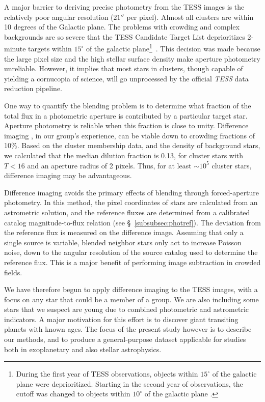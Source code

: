 \documentclass[12pt,twocolumn,tighten]{aastex62}
\begin{document}
A major barrier to deriving precise photometry from the TESS images is
the relatively poor angular resolution ($21''$ per pixel).  Almost all
clusters are within 10 degrees of the Galactic plane. The problems
with crowding and complex backgrounds are so severe that the TESS
Candidate Target List deprioritizes 2-minute targets within $15^\circ$
of the galactic plane\footnote{During the first year of TESS
observations, objects within $15^\circ$ of the galactic plane were
deprioritized. Starting in the second year of observations,
the cutoff was changed to
objects within $10^\circ$ of the galactic plane
\citep{stassun_TIC8_2019}.}~\citep{stassun_TIC_2018,stassun_TIC8_2019}.
This decision was made because the large pixel size and the high
stellar surface density make aperture photometry unreliable.  However,
it implies that most stars in clusters, though capable of yielding a
cornucopia of science, will go unprocessed by the official {\it TESS}
data reduction pipeline.

One way to quantify the blending problem is to determine what fraction
of the total flux in a photometric aperture is contributed by a
particular target star. Aperture photometry is reliable when this
fraction is close to unity.  Difference imaging
\citep{Alard_Lupton_1998,miller_optimal_2008}, in our group's
experience, can be viable down to crowding fractions of 10\%.  Based
on the \citet{Kharchenko_et_al_2013} cluster membership data, and the
density of background stars, we calculated that the median dilution
fraction is 0.13, for cluster stars with $T< 16$ and an aperture
radius of 2 pixels.  Thus, for at least $\sim$$10^5$ cluster stars,
difference imaging may be advantageous.

Difference imaging avoids the primary effects of blending through
forced-aperture photometry.  In this method,
the pixel coordinates
of stars are calculated from an astrometric
solution, and the reference fluxes are determined from a calibrated
catalog magnitude-to-flux relation (see \S~\ref{subsubsec:photref}).
The deviation from the reference
flux is measured on the difference image.  Assuming that only a single
source is variable, blended neighbor stars only act to
increase Poisson noise, down to
the angular resolution of the source catalog used to determine the
reference flux.  This is a major benefit of performing image
subtraction in crowded fields.

We have therefore begun to apply difference imaging to the
TESS images, with a focus on any star that could be a member
of a group.  We
are also including some stars that we suspect are young due to
combined photometric and astrometric indicators.
A major motivation for
this effort is to discover giant transiting planets with known ages.
The focus of the present study however is to describe our
methods, and to produce a general-purpose
dataset applicable for studies both in exoplanetary and also
stellar astrophysics.
\end{document}
